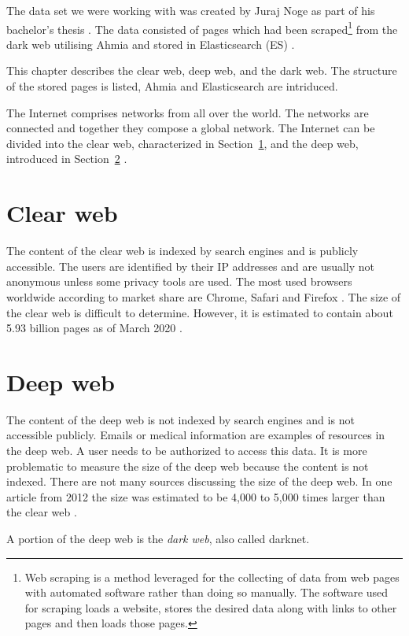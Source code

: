 \label{datasetAnalysis}
The data set we were working with was created by Juraj Noge as part of his bachelor's thesis \cite{bcScraping}. The data consisted of pages which had been scraped\footnote{Web scraping is a method leveraged for the collecting of data from web pages with automated software rather than doing so manually. The software used for scraping loads a website, stores the desired data along with links to other pages and then loads those pages.} from the dark web utilising Ahmia \cite{ahmia} and stored in Elasticsearch (ES) \cite{elasticSearch} \cite{bcScraping}. 

This chapter describes the clear web, deep web, and the dark web. The structure of the stored pages is listed, Ahmia and Elasticsearch are intriduced.

The Internet comprises networks from all over the world. The networks are connected and together they compose a global network. The Internet can be divided into the clear web, characterized in Section~\ref{clearWeb}, and the deep web, introduced in Section~\ref{deepWeb} \cite{internetStructure}.

\section{Clear web} \label{clearWeb}
The content of the clear web is indexed by search engines and is publicly accessible. The users are identified by their IP addresses and are usually not anonymous unless some privacy tools are used. The most used browsers worldwide according to market share are Chrome, Safari and Firefox \cite{browserMarketShare}. The size of the clear web is difficult to determine. However, it is estimated to contain about 5.93 billion pages as of March 2020 \cite{clearWebSize}.

\section{Deep web} \label{deepWeb}
The content of the deep web is not indexed by search engines and is not accessible publicly. Emails or medical information are examples of resources in the deep web. A user needs to be authorized to access this data. It is more problematic to measure the size of the deep web because the content is not indexed. There are not many sources discussing the size of the deep web. In one article from 2012 the size was estimated to be 4,000 to 5,000 times larger than the clear web \cite{deepWebSize}. 

A portion of the deep web is the \textit{dark web}, also called darknet. 
